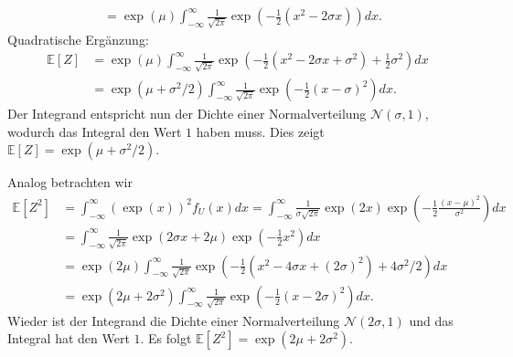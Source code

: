 \documentclass[a4paper]{article}
\begin{document}
\begin{enumerate}[label=(\alph*)]
\begin{align*}
		                    & = \exp(\mu) \int_{-\infty}^{\infty} \frac{1}{\sqrt{2\pi}} \exp\left(-\frac{1}{2} (x^2 - 2 \sigma x )\right)dx\text{.}
	      \end{align*}
	      Quadratische Ergänzung:
	      \begin{align*}
		      \mathds{E}[Z] & = \exp(\mu) \int_{-\infty}^{\infty} \frac{1}{\sqrt{2\pi}} \exp\left(-\frac{1}{2} (x^2 - 2 \sigma x + \sigma^2 ) + \frac{1}{2} \sigma^2\right)dx \\
		                    & = \exp(\mu + \sigma^2/2)  \int_{-\infty}^{\infty} \frac{1}{\sqrt{2\pi}} \exp\left(-\frac{1}{2} (x - \sigma)^2\right)dx\text{.}
	      \end{align*}
	      Der Integrand entspricht nun der Dichte einer Normalverteilung $\mathcal{N}(\sigma, 1)$, wodurch das Integral den Wert $1$ haben muss. Dies zeigt $\mathds{E}[Z] = \exp(\mu + \sigma^2/2)$.

	      Analog betrachten wir
	      \begin{align*}
		      \mathds{E}[Z^2] & = \int_{-\infty}^{\infty} (\exp(x))^2 f_U(x) dx = \int_{-\infty}^{\infty} \frac{1}{\sigma \sqrt{2 \pi}} \exp(2x) \exp\left(- \frac{1}{2} \frac{(x - \mu)^2}{\sigma^2}\right) dx \\
		                      & = \int_{-\infty}^{\infty} \frac{1}{\sqrt{2 \pi}} \exp(2 \sigma x + 2 \mu) \exp\left(- \frac{1}{2} x^2\right) dx                                                                 \\
		                      & = \exp(2 \mu) \int_{-\infty}^{\infty} \frac{1}{\sqrt{2 \pi}}\exp\left(- \frac{1}{2} (x^2 - 4 \sigma x + (2 \sigma)^2) + 4 \sigma^2 / 2\right) dx                                \\
		                      & = \exp(2 \mu + 2 \sigma^2) \int_{-\infty}^{\infty} \frac{1}{\sqrt{2 \pi}}\exp\left(- \frac{1}{2} (x-2\sigma)^2\right) dx\text{.}
	      \end{align*}
	      Wieder ist der Integrand die Dichte einer Normalverteilung $\mathcal{N}(2 \sigma, 1)$ und das Integral hat den Wert $1$. Es folgt $\mathds{E}[Z^2] = \exp(2 \mu + 2 \sigma^2)$.
\end{enumerate}

\subsection{}
\end{document}
